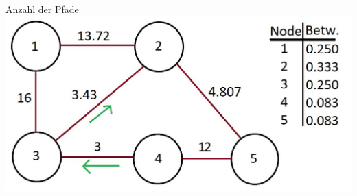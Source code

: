 \documentclass[aspectratio=169,10pt]{beamer}
\begin{document}
\begin{frame}[fragile]{Anzahl der Pfade}
\includegraphics[width=.7\textwidth]{images/kai_5.jpg}
\end{frame}



\end{document}
